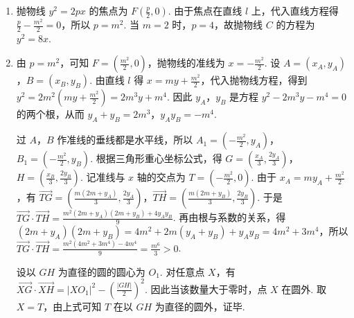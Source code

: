 \begin{solution}
\begin{enumerate}
\item 抛物线 \(y^2=2px\) 的焦点为 \(F\left(\frac{p}{2},0\right)\). 由于焦点在直线 \(l\) 上，代入直线方程得
\(\frac{p}{2}-\frac{m^2}{2}=0\)，所以 \(p=m^2\). 当 \(m=2\) 时，\(p=4\)，故抛物线 \(C\) 的方程为 \(y^2=8x\).
\item 由 \(p=m^2\)，可知 \(F=\left(\frac{m^2}{2},0\right)\)，抛物线的准线为 \(x=-\frac{m^2}{2}\). 设 \(A=(x_A,y_A)\)，\(B=(x_B,y_B)\). 由直线 \(l\) 得 \(x=my+\frac{m^2}{2}\)，代入抛物线方程，得到
\(y^2=2m^2\left(my+\frac{m^2}{2}\right)=2m^3y+m^4\). 因此 \(y_A\)，\(y_B\) 是方程 \(y^2-2m^3y-m^4=0\) 的两个根，从而
\(y_A+y_B=2m^3\)，\(y_Ay_B=-m^4\).

过 \(A\)，\(B\) 作准线的垂线都是水平线，所以 \(A_1=\left(-\frac{m^2}{2},y_A\right)\)，\(B_1=\left(-\frac{m^2}{2},y_B\right)\). 根据三角形重心坐标公式，得
\(G=\left(\frac{x_A}{3},\frac{2y_A}{3}\right)\)，\(H=\left(\frac{x_B}{3},\frac{2y_B}{3}\right)\). 记准线与 \(x\) 轴的交点为 \(T=\left(-\frac{m^2}{2},0\right)\). 由于 \(x_A=my_A+\frac{m^2}{2}\)，有
\(\overrightarrow{TG}=\left(\frac{m(2m+y_A)}{3},\frac{2y_A}{3}\right)\)，\(\overrightarrow{TH}=\left(\frac{m(2m+y_B)}{3},\frac{2y_B}{3}\right)\). 于是
\(\overrightarrow{TG}\cdot\overrightarrow{TH}=\frac{m^2(2m+y_A)(2m+y_B)+4y_Ay_B}{9}\). 再由根与系数的关系，得
\((2m+y_A)(2m+y_B)=4m^2+2m(y_A+y_B)+y_Ay_B=4m^2+3m^4\)，所以
\(\overrightarrow{TG}\cdot\overrightarrow{TH}=\frac{m^2(4m^2+3m^4)-4m^4}{9}=\frac{m^6}{3}>0\).

设以 \(GH\) 为直径的圆的圆心为 \(O_1\). 对任意点 \(X\)，有 \(\overrightarrow{XG}\cdot\overrightarrow{XH}=|XO_1|^2-\left(\frac{|GH|}{2}\right)^2\). 因此当该数量大于零时，点 \(X\) 在圆外. 取 \(X=T\)，由上式可知 \(T\) 在以 \(GH\) 为直径的圆外，证毕.
\end{enumerate}
\end{solution}
